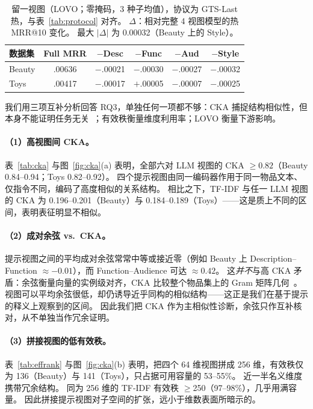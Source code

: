 \documentclass[sigconf,natbib=true,anonymous]{acmart}
\begin{document}
\begin{table}[t]
\centering
\caption{%
留一视图（LOVO；零掩码，3 种子均值），协议为 GTS-Last 热，与表~\ref{tab:protocol} 对齐。
$\Delta$：相对完整 4 视图模型的热 MRR@10 变化。
最大 $|\Delta|$ 为 0.00032（Beauty 上的 Style）。%
}
\label{tab:lovo}
\small
\setlength{\tabcolsep}{3.5pt}
\begin{tabular}{@{}lccccc@{}}
\toprule
数据集 & Full MRR & $-$Desc & $-$Func & $-$Aud & $-$Style \\
\midrule
Beauty & .00636 & $-$.00021 & $-$.00030 & $-$.00027 & $-$.00032 \\
Toys   & .00417 & $-$.00017 & $+$.00005 & $-$.00007 & $-$.00025 \\
\bottomrule
\end{tabular}
\end{table}

我们用三项互补分析回答 RQ3，单独任何一项都不够：CKA 捕捉结构相似性，但本身不能证明任务无关~\cite{kornblith2019cka}；有效秩衡量维度利用率；LOVO 衡量下游影响。

\paragraph{（1）高视图间 CKA。}
表~\ref{tab:cka} 与图~\ref{fig:cka}(a) 表明，全部六对 LLM 视图的 CKA $\ge 0.82$（Beauty 0.84--0.94；Toys 0.82--0.92）。
四个提示视图由同一编码器作用于同一物品文本、仅指令不同，编码了高度相似的关系结构。
相比之下，TF-IDF 与任一 LLM 视图的 CKA 为 0.196--0.201（Beauty）与 0.184--0.189（Toys）——这是质上不同的区间，表明表征明显不相似。

\paragraph{（2）成对余弦 vs.\ CKA。}
提示视图之间的平均成对余弦常常中等或接近零（例如 Beauty 上 Description--Function $\approx -0.01$），而 Function--Audience 可达 $\approx 0.42$。
这\emph{并不}与高 CKA 矛盾：余弦衡量向量的实例级对齐，CKA 比较整个物品集上的 Gram 矩阵几何~\cite{kornblith2019cka}。
视图可以平均余弦很低，却仍诱导近乎同构的相似结构——这正是我们在基于提示的释义上观察到的区间。
因此我们把 CKA 作为主相似性诊断，余弦只作互补核对，从不单独当作冗余证明。

\paragraph{（3）拼接视图的低有效秩。}
表~\ref{tab:effrank} 与图~\ref{fig:cka}(b) 表明，把四个 64 维视图拼成 256 维，有效秩仅为 136（Beauty）与 141（Toys），只占据可用容量的 53--55\%。
近一半名义维度携带冗余结构。
同为 256 维的 TF-IDF 有效秩 $\ge$250（97--98\%），几乎用满容量。
因此拼接提示视图对子空间的扩张，远小于维数表面所暗示的。
\end{document}

